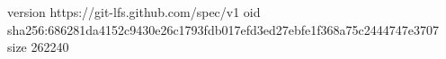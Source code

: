 version https://git-lfs.github.com/spec/v1
oid sha256:686281da4152c9430e26c1793fdb017efd3ed27ebfe1f368a75c2444747e3707
size 262240
